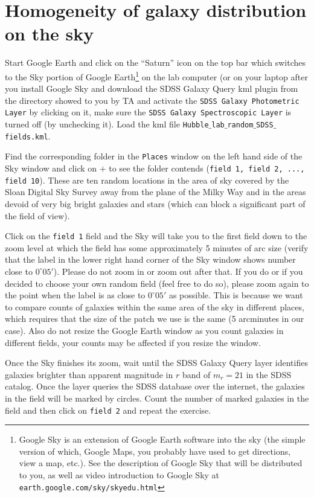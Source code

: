 \documentclass[12pt]{article}
\begin{document}
\section*{Homogeneity of galaxy distribution on the sky}

Start Google Earth and click on the ``Saturn'' icon on the top
bar which switches to the Sky portion of Google Earth\footnote{Google Sky is an extension of Google
Earth software into the sky (the simple version of which, Google Maps,
you probably have used to get directions, view a map, etc.).  See the
description of Google Sky that will be distributed to you, as well
as video introduction to Google Sky at {\tt
earth.google.com/sky/skyedu.html}} on the lab computer (or on your
laptop after you install Google Sky and download the SDSS Galaxy Query
kml plugin from the directory showed to you by TA and activate the
\texttt{SDSS Galaxy Photometric Layer} by clicking on it, make sure
the \texttt{SDSS Galaxy Spectroscopic Layer} is turned off (by
unchecking it). Load the kml file {\tt Hubble$\_$lab$\_$random$\_$SDSS$\_$fields.kml}. 

Find the corresponding folder in the {\tt Places} window on the left
hand side of the Sky window and click on $+$ to see the folder
contends ({\tt field 1, field 2, ..., field 10}).  These are ten
random locations in the area of sky covered by the Sloan Digital Sky
Survey away from the plane of the Milky Way and in the areas devoid of
very big bright galaxies and stars (which can block a significant part
of the field of view).  

Click on the {\tt field 1} field and the Sky
will take you to the first field down to the zoom level at which the
field has some approximately 5 minutes of arc size (verify that
the label in the lower right hand
corner of the Sky window shows number close to $0^{\circ}05'$). Please do not zoom
in or zoom out after that. If you do or if you decided to choose your own random field (feel
free to do so),
please zoom again to the point when the label is as close to $0^{\circ}05'$
as possible. This is because we want to compare counts of galaxies
within the same area of the sky in different places, which requires
that the size of the patch we use is the same (5 arcminutes in our
case). Also do not resize the Google Earth window as you count galaxies
in different fields, your counts may be affected if you resize the window. 

Once the Sky finishes its zoom, wait until the SDSS Galaxy Query layer
identifies galaxies brighter than apparent magnitude in $r$ band of $m_r=21$ in the SDSS catalog. 
Once the layer queries the SDSS database over the internet, the galaxies
in the field will be marked by circles. Count the number of marked 
galaxies in the field and then click on {\tt field 2} and repeat the exercise. 
\end{document}
